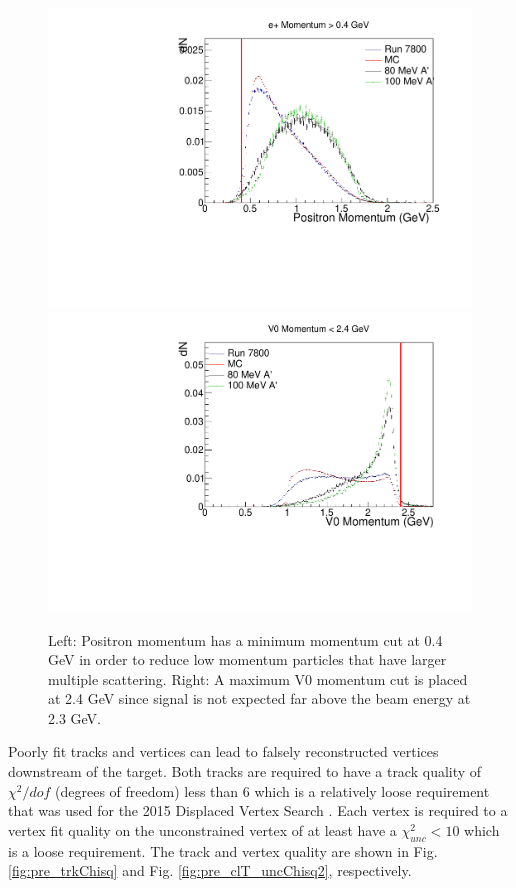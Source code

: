 \begin{figure}[t]
    \centering
    \includegraphics[width=.45\textwidth]{figs/recon/pre_posP.pdf}
    \includegraphics[width=.45\textwidth]{figs/recon/pre_uncP.pdf}
    \caption{Left: Positron momentum has a minimum momentum cut at 0.4 GeV in order to reduce low momentum particles that have larger multiple scattering. Right: A maximum V0 momentum cut is placed at 2.4 GeV since signal is not expected far above the beam energy at 2.3 GeV.}
    \label{fig:pre_V0p}
\end{figure}

 Poorly fit tracks and vertices can lead to falsely reconstructed vertices downstream of the target. Both tracks are required to have a track quality of $\chi^{2}/dof$ (degrees of freedom) less than 6 which is a relatively loose requirement that was used for the 2015 Displaced Vertex Search \cite{adrian2018search}. Each vertex is required to a vertex fit quality on the unconstrained vertex of at least have a $\chi^{2}_{unc} < 10$ which is a loose requirement. The track and vertex quality are shown in Fig. \ref{fig:pre_trkChisq} and Fig. \ref{fig:pre_clT_uncChisq2}, respectively.
 

